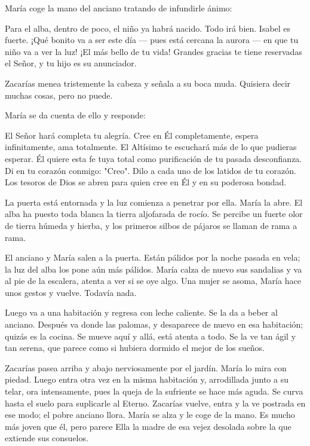 \documentclass[12pt, twoside, openright]{book} %
\begin{document}
María coge la mano del anciano tratando de infundirle ánimo: 

Para el alba, dentro de poco, el niño ya habrá nacido. Todo irá bien. Isabel es fuerte. ¡Qué bonito va a ser este día — pues está cercana la aurora — en que tu niño va a ver la luz! ¡El más bello de tu vida! Grandes gracias te tiene reservadas el Señor, y tu hijo es su anunciador. 

Zacarías menea tristemente la cabeza y señala a su boca muda. Quisiera decir muchas cosas, pero no puede. 

María se da cuenta de ello y responde: 

El Señor hará completa tu alegría. Cree en Él completamente, espera infinitamente, ama totalmente. El Altísimo te escuchará más de lo que pudieras esperar. Él quiere esta fe tuya total como purificación de tu pasada desconfianza. Di en tu corazón conmigo: "Creo". Dilo a cada uno de los latidos de tu corazón. Los tesoros de Dios se abren para quien cree en Él y en su poderosa bondad. 

La puerta está entornada y la luz comienza a penetrar por ella. María la abre. El alba ha puesto toda blanca la tierra aljofarada de rocío. Se percibe un fuerte olor de tierra húmeda y hierba, y los primeros silbos de pájaros se llaman de rama a rama. 

El anciano y María salen a la puerta. Están pálidos por la noche pasada en vela; la luz del alba los pone aún más pálidos. María calza de nuevo sus sandalias y va al pie de la escalera, atenta a ver si se oye algo. Una mujer se asoma, María hace unos gestos y vuelve. Todavía nada. 

Luego va a una habitación y regresa con leche caliente. Se la da a beber al anciano. Después va donde las palomas, y desaparece de nuevo en esa habitación; quizás es la cocina. Se mueve aquí y allá, está atenta a todo. Se la ve tan ágil y tan serena, que parece como si hubiera dormido el mejor de los sueños. 

Zacarías pasea arriba y abajo nerviosamente por el jardín. María lo mira con piedad. Luego entra otra vez en la misma habitación y, arrodillada junto a su telar, ora intensamente, pues la queja de la sufriente se hace más aguda. Se curva hasta el suelo para suplicarle al Eterno. Zacarías vuelve, entra y la ve postrada en ese modo; el pobre anciano llora. María se alza y le coge de la mano. Es mucho más joven que él, pero parece Ella la madre de esa vejez desolada sobre la que extiende sus consuelos. 
\end{document}
